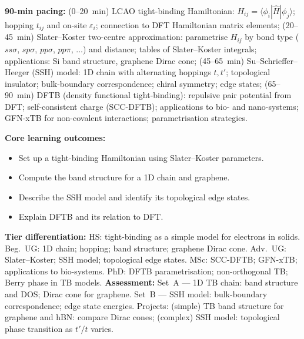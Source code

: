 \documentclass[11pt,a4paper]{article}
\begin{document}
\medskip

\begin{tcolorbox}[chembox, title={Module~III.3 --- Lecture L06: Tight-Binding and Effective Hamiltonians}]
\textbf{90-min pacing:} (0--20~min) LCAO tight-binding Hamiltonian: $H_{ij}=\langle\phi_i|\hat{H}|\phi_j\rangle$; hopping $t_{ij}$ and on-site $\varepsilon_i$; connection to DFT Hamiltonian matrix elements; (20--45~min) Slater--Koster two-centre approximation: parametrise $H_{ij}$ by bond type ($ss\sigma$, $sp\sigma$, $pp\sigma$, $pp\pi$, $\ldots$) and distance; tables of Slater--Koster integrals; applications: Si band structure, graphene Dirac cone; (45--65~min) Su--Schrieffer--Heeger (SSH) model: 1D chain with alternating hoppings $t,t'$; topological insulator; bulk-boundary correspondence; chiral symmetry; edge states; (65--90~min) DFTB (density functional tight-binding): repulsive pair potential from DFT; self-consistent charge (SCC-DFTB); applications to bio- and nano-systems; GFN-xTB for non-covalent interactions; parametrisation strategies.

\medskip\textbf{Core learning outcomes:}
\begin{itemize}[leftmargin=1.4em,topsep=2pt,itemsep=1pt]
  \item Set up a tight-binding Hamiltonian using Slater--Koster parameters.
  \item Compute the band structure for a 1D chain and graphene.
  \item Describe the SSH model and identify its topological edge states.
  \item Explain DFTB and its relation to DFT.
\end{itemize}
\medskip\textbf{Tier differentiation:}
HS: tight-binding as a simple model for electrons in solids.
Beg.\ UG: 1D chain; hopping; band structure; graphene Dirac cone.
Adv.\ UG: Slater--Koster; SSH model; topological edge states.
MSc: SCC-DFTB; GFN-xTB; applications to bio-systems.
PhD: DFTB parametrisation; non-orthogonal TB; Berry phase in TB models.
\medskip\textbf{Assessment:}
Set~A --- 1D TB chain: band structure and DOS; Dirac cone for graphene.
Set~B --- SSH model: bulk-boundary correspondence; edge state energies.
Projects: (simple) TB band structure for graphene and hBN: compare Dirac cones; (complex) SSH model: topological phase transition as $t'/t$ varies.
\end{tcolorbox}

\medskip
\end{document}

